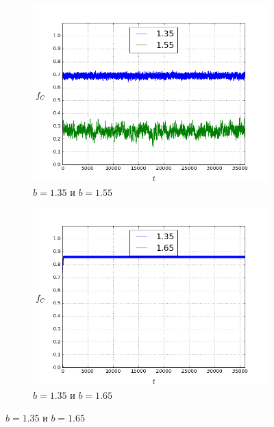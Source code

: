 \documentclass[a4paper]{article}
\begin{document}
\begin{figure}
	\ContinuedFloat
	\begin{subfigure}{.5\textwidth}
		\includegraphics[width=.8\linewidth]{135-155.png}
		\caption{$b=1.35$ и $b=1.55$}
	\end{subfigure}
	\begin{subfigure}{.5\textwidth}
		\includegraphics[width=.8\linewidth]{135-165.png}
		\caption{$b=1.35$ и $b=1.65$}
	\end{subfigure}%
	

\end{figure}
\end{document}
